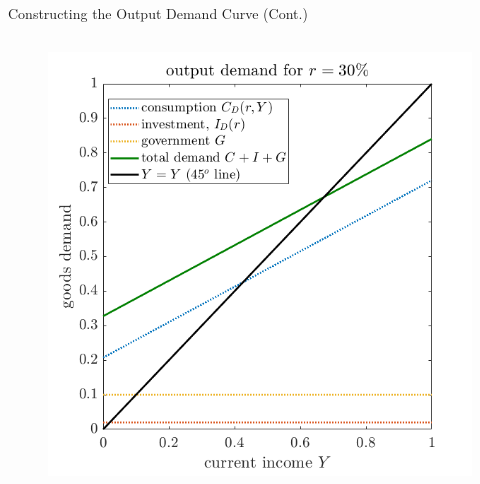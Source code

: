 \documentclass[11pt,aspectratio=43]{beamer}
\theoremstyle{definition}
\begin{document}
\begin{frame}{Constructing the Output Demand Curve (Cont.)}
\begin{columns}
\begin{column}{0.55\textwidth}
\begin{figure}
                \includegraphics[width=\textwidth]{./figures/OutputDemand_2.png}
            \end{figure}
        \end{column}
    \end{columns}
\end{frame}
\end{document}
